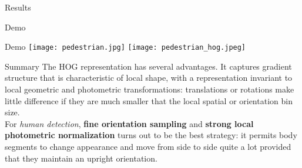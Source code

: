 \begin{frame}{Results}




\end{frame}

\begin{frame}[standout]
  \huge Demo
\end{frame}

\begin{frame}{Demo}
  \centering
  \texttt{[image: pedestrian.jpg]}
  \hspace{2mm}
  \texttt{[image: pedestrian\_hog.jpeg]}
\end{frame}

\begin{frame}{Summary}
  \small
  The HOG representation has several advantages. It captures gradient
  structure that is characteristic of local shape, with a representation invariant
  to local geometric and photometric transformations: translations or rotations make little difference
  if they are much smaller that the local spatial or orientation bin size. \\
  \vspace{5mm}
  For \textit{human detection}, \textbf{fine orientation sampling} and \textbf{strong
  local photometric normalization} turns out to be the best strategy: it permits body
  segments to change appearance and move from side to side quite a lot provided
  that they maintain an upright orientation.

\end{frame}
